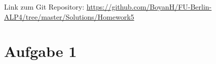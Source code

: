 \usepackage{graphicx}
\usepackage{amsmath}
\usepackage{amssymb}
\usepackage{fancyvrb}

\newcommand{\dozent}{Prof. Dr. Margarita Esponda}					%
\newcommand{\tutor}{Lilli Walter}						%
\newcommand{\tutoriumNo}{6}				%
\newcommand{\projectNo}{5}									%
\newcommand{\veranstaltung}{Nichtsequentielle Programmierung}	%
\newcommand{\semester}{SoeSe 2017}						%
\newcommand{\studenten}{Boyan Hristov, Sergelen Gongor}			%





Link zum Git Repository: \url{https://github.com/BoyanH/FU-Berlin-ALP4/tree/master/Solutions/Homework5}


\section*{Aufgabe 1}

